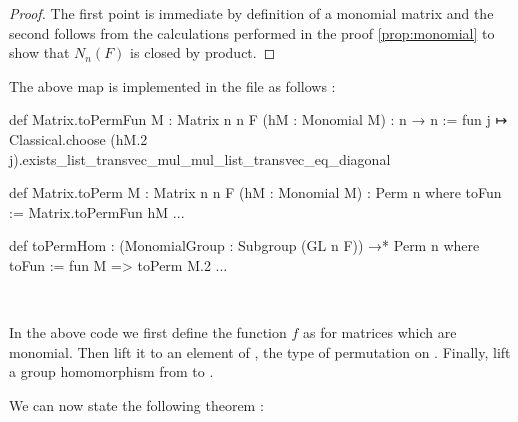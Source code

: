 \begin{proof}
    The first point is immediate by definition of a monomial matrix and the second follows from the calculations performed in the proof \ref{prop:monomial} to show that $N_n\left( F \right)$ is closed by product.
\end{proof}

The above map is implemented in the  file as follows :
\begin{leancode}
def Matrix.toPermFun {M : Matrix n n F} (hM : Monomial M) : n → n :=
  fun j ↦ Classical.choose (hM.2 j).exists_list_transvec_mul_mul_list_transvec_eq_diagonal

def Matrix.toPerm {M : Matrix n n F} (hM : Monomial M) : Perm n where
  toFun := Matrix.toPermFun hM
  ...

def toPermHom : (MonomialGroup : Subgroup (GL n F)) →* Perm n where
  toFun := fun M => toPerm M.2
  ...
\end{leancode}

\begin{commentary} \

    In the above code we first define the function $f$ as  for matrices which are monomial. Then  lift it to an element of , the type of permutation on . Finally,  lift  a group homomorphism from  to .
\end{commentary}

We can now state the following theorem :

